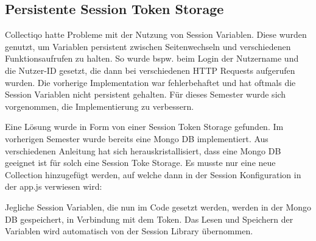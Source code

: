 \subsection{Persistente Session Token Storage}\label{subsec:persistente-session-token-storage}
Collectiqo hatte Probleme mit der Nutzung von Session Variablen.
Diese wurden genutzt, um Variablen persistent zwischen Seitenwechseln und verschiedenen Funktionsaufrufen zu halten.
So wurde bspw. beim Login der Nutzername und die Nutzer-ID gesetzt, die dann bei verschiedenen HTTP Requests aufgerufen wurden.
Die vorherige Implementation war fehlerbehaftet und hat oftmals die Session Variablen nicht persistent gehalten.
Für dieses Semester wurde sich vorgenommen, die Implementierung zu verbessern.

Eine Lösung wurde in Form von einer Session Token Storage gefunden.
Im vorherigen Semester wurde bereits eine Mongo DB implementiert.
Aus verschiedenen Anleitung hat sich herauskristallisiert, dass eine Mongo DB geeignet ist für solch eine Session Toke Storage.
Es musste nur eine neue Collection hinzugefügt werden, auf welche dann in der Session Konfiguration in der app.js verwiesen wird:


Jegliche Session Variablen, die nun im Code gesetzt werden, werden in der Mongo DB gespeichert, in Verbindung mit dem Token.
Das Lesen und Speichern der Variablen wird automatisch von der Session Library übernommen.